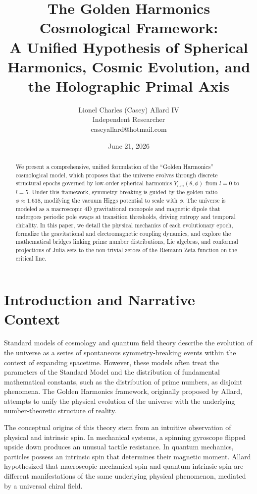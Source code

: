 \documentclass[11pt,twoside,a4paper]{article}
\title{The Golden Harmonics Cosmological Framework: \\
A Unified Hypothesis of Spherical Harmonics, Cosmic Evolution, and the Holographic Primal Axis}
\author{Lionel Charles (Casey) Allard IV \\ 
\small Independent Researcher \\
\small caseyallard@hotmail.com}
\date{June 21, 2026}
\begin{document}
\maketitle

\begin{abstract}
We present a comprehensive, unified formulation of the ``Golden Harmonics'' cosmological model, which proposes that the universe evolves through discrete structural epochs governed by low-order spherical harmonics $Y_{l,m}(\theta, \phi)$ from $l=0$ to $l=5$. Under this framework, symmetry breaking is guided by the golden ratio $\phi \approx 1.618$, modifying the vacuum Higgs potential to scale with $\phi$. The universe is modeled as a macroscopic 4D gravitational monopole and magnetic dipole that undergoes periodic pole swaps at transition thresholds, driving entropy and temporal chirality. In this paper, we detail the physical mechanics of each evolutionary epoch, formalize the gravitational and electromagnetic coupling dynamics, and explore the mathematical bridges linking prime number distributions, Lie algebras, and conformal projections of Julia sets to the non-trivial zeroes of the Riemann Zeta function on the critical line.
\end{abstract}

\section{Introduction and Narrative Context}
Standard models of cosmology and quantum field theory describe the evolution of the universe as a series of spontaneous symmetry-breaking events within the context of expanding spacetime. However, these models often treat the parameters of the Standard Model and the distribution of fundamental mathematical constants, such as the distribution of prime numbers, as disjoint phenomena. The Golden Harmonics framework, originally proposed by Allard, attempts to unify the physical evolution of the universe with the underlying number-theoretic structure of reality.

The conceptual origins of this theory stem from an intuitive observation of physical and intrinsic spin. In mechanical systems, a spinning gyroscope flipped upside down produces an unusual tactile resistance. In quantum mechanics, particles possess an intrinsic spin that determines their magnetic moment. Allard hypothesized that macroscopic mechanical spin and quantum intrinsic spin are different manifestations of the same underlying physical phenomenon, mediated by a universal chiral field.
\end{document}

